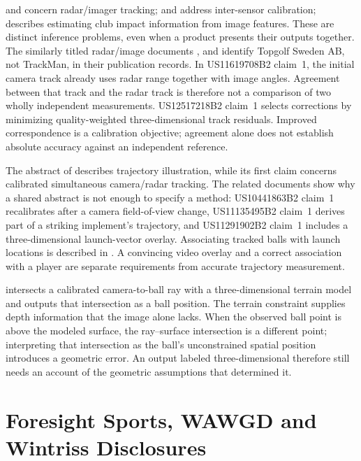 \begin{description}
 and  concern radar/imager
tracking;  and  address
inter-sensor calibration;  describes estimating
club impact information from image features. These are distinct inference
problems, even when a product presents their outputs together. The
similarly titled radar/image documents ,
 and  identify Topgolf Sweden AB,
not TrackMan, in their publication records.
In US11619708B2 claim~1, the initial camera track already uses radar range together with image angles.
Agreement between that track and the radar track is therefore not a comparison of two wholly independent measurements.
US12517218B2 claim~1 selects corrections by minimizing quality-weighted three-dimensional track residuals.
Improved correspondence is a calibration objective; agreement alone does not establish absolute accuracy against an independent reference.
\item[Display and Attribution.]
The abstract of  describes trajectory illustration, while its first claim concerns calibrated simultaneous camera/radar tracking.
The related documents show why a shared abstract is not enough to specify a method: US10441863B2 claim~1 recalibrates after a camera field-of-view change, US11135495B2 claim~1 derives part of a striking implement's trajectory, and US11291902B2 claim~1 includes a three-dimensional launch-vector overlay.
Associating tracked balls with launch locations is described in . A convincing video overlay and a correct association with a
player are separate requirements from accurate trajectory measurement.
\item[Terrain-Constrained Position.]
 intersects a calibrated camera-to-ball ray with a three-dimensional terrain model and outputs that intersection as a ball position.
The terrain constraint supplies depth information that the image alone lacks.
When the observed ball point is above the modeled surface, the ray--surface intersection is a different point; interpreting that intersection as the ball's unconstrained spatial position introduces a geometric error.
An output labeled three-dimensional therefore still needs an account of the geometric assumptions that determined it.
\end{description}

\section{Foresight Sports, WAWGD and Wintriss Disclosures}
\label{sec:wintriss}

